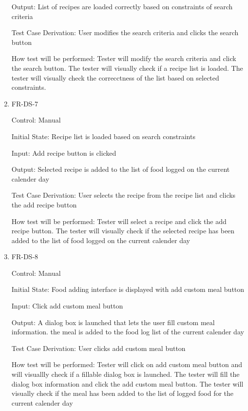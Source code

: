 \documentclass[12pt, titlepage]{article}
\begin{document}
\begin{enumerate}
Output: List of recipes are loaded correctly based on constraints of search criteria

Test Case Derivation: User modifies the search criteria and clicks the search button

How test will be performed: Tester will modify the search criteria and click the search button. The tester will visually check if a recipe list is loaded. The tester will visually check the correcctness of the list based on selected constraints.

\item{FR-DS-7\\}

Control: Manual
					
Initial State: Recipe list is loaded based on search constraints
					
Input: Add recipe button is clicked
					
Output: Selected recipe is added to the list of food logged on the current calender day

Test Case Derivation: User selects the recipe from the recipe list and clicks the add recipe button

How test will be performed: Tester will select a recipe and click the add recipe button. The tester will visually check if the selected recipe has been added to the list of food logged on the current calender day

\item{FR-DS-8 \\}

Control: Manual
					
Initial State: Food adding interface is displayed with add custom meal button
					
Input: Click add custom meal button
					
Output: A dialog box is launched that lets the user fill custom meal information. the meal is added to the food log list of the current calender day

Test Case Derivation: User clicks add custom meal button

How test will be performed: Tester will click on add custom meal button and will visuallly check if a fillable dialog box is launched. The tester will fill the dialog box information and click the add custom meal button. The tester will visually check if the meal has been added to the list of logged food for the current calender day

\end{enumerate}
\end{document}
